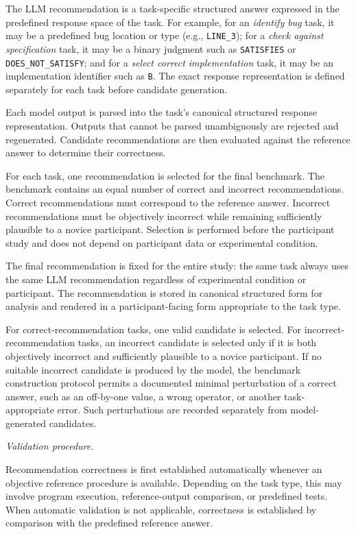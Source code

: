 \documentclass[oneside,final,14pt,a4paper]{extreport}
\begin{document}
The LLM recommendation is a task-specific structured answer expressed 
in the predefined response space of the task. For example, 
for an \emph{identify bug} task, it 
may be a predefined bug location or type (e.g., \texttt{LINE\_3}); 
for a \emph{check against specification} task, it may be a binary judgment 
such as \texttt{SATISFIES} or \texttt{DOES\_NOT\_SATISFY}; and for a 
\emph{select correct implementation} task, it may be an implementation 
identifier such as \texttt{B}. The exact response representation is defined 
separately for each task before candidate generation.

Each model output is parsed into the task's canonical structured response 
representation. Outputs that cannot be parsed unambiguously are rejected 
and regenerated. Candidate recommendations are then evaluated against the 
reference answer to determine their correctness.

For each task, one recommendation is selected for the final benchmark. 
The benchmark contains an equal number of correct and incorrect recommendations. 
Correct recommendations must correspond to the reference answer. Incorrect 
recommendations must be objectively incorrect while remaining sufficiently 
plausible to a novice participant. Selection is performed before the participant 
study and does not depend on participant data or experimental condition.

The final recommendation is fixed for the entire study: the same task always 
uses the same LLM recommendation regardless of experimental condition or 
participant. The recommendation is stored in canonical structured form for 
analysis and rendered in a participant-facing form appropriate to the task type.

For correct-recommendation tasks, one valid candidate is selected. For
incorrect-recommendation tasks, an incorrect candidate is selected only if it
is both objectively incorrect and sufficiently plausible to a novice
participant. If no suitable incorrect candidate is produced by the model, the
benchmark construction protocol permits a documented minimal perturbation of
a correct answer, such as an off-by-one value, a wrong operator, or another
task-appropriate error. Such perturbations are recorded separately from
model-generated candidates.

\emph{Validation procedure.}

Recommendation correctness is first established automatically whenever an 
objective reference procedure is available. Depending on the task type, this 
may involve program execution, reference-output comparison, or predefined tests. 
When automatic validation is not applicable, correctness is established by comparison 
with the predefined reference answer.
\end{document}
